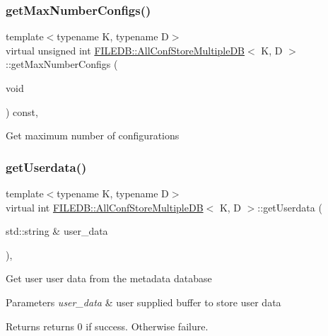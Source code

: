 \subsubsection{\texorpdfstring{getMaxNumberConfigs()}{getMaxNumberConfigs()}\hspace{0.1cm}{\footnotesize\ttfamily [3/3]}}
{\footnotesize\ttfamily template$<$typename K, typename D$>$ \\
virtual unsigned int \mbox{\hyperlink{classFILEDB_1_1AllConfStoreMultipleDB}{F\+I\+L\+E\+D\+B\+::\+All\+Conf\+Store\+Multiple\+DB}}$<$ K, D $>$\+::get\+Max\+Number\+Configs (\begin{DoxyParamCaption}\item[{void}]{ }\end{DoxyParamCaption}) const\hspace{0.3cm}{\ttfamily [inline]}, {\ttfamily [virtual]}}

Get maximum number of configurations \mbox{\label{classFILEDB_1_1AllConfStoreMultipleDB_a9a314fba1056c35ffe54e35e98e83523}} 
\subsubsection{\texorpdfstring{getUserdata()}{getUserdata()}\hspace{0.1cm}{\footnotesize\ttfamily [1/3]}}
{\footnotesize\ttfamily template$<$typename K, typename D$>$ \\
virtual int \mbox{\hyperlink{classFILEDB_1_1AllConfStoreMultipleDB}{F\+I\+L\+E\+D\+B\+::\+All\+Conf\+Store\+Multiple\+DB}}$<$ K, D $>$\+::get\+Userdata (\begin{DoxyParamCaption}\item[{std\+::string \&}]{user\+\_\+data }\end{DoxyParamCaption})\hspace{0.3cm}{\ttfamily [inline]}, {\ttfamily [virtual]}}

Get user user data from the metadata database


\begin{DoxyParams}{Parameters}
{\em user\+\_\+data} & user supplied buffer to store user data \\
\hline
\end{DoxyParams}
\begin{DoxyReturn}{Returns}
returns 0 if success. Otherwise failure. 
\end{DoxyReturn}
\mbox{\label{classFILEDB_1_1AllConfStoreMultipleDB_a9a314fba1056c35ffe54e35e98e83523}} 
